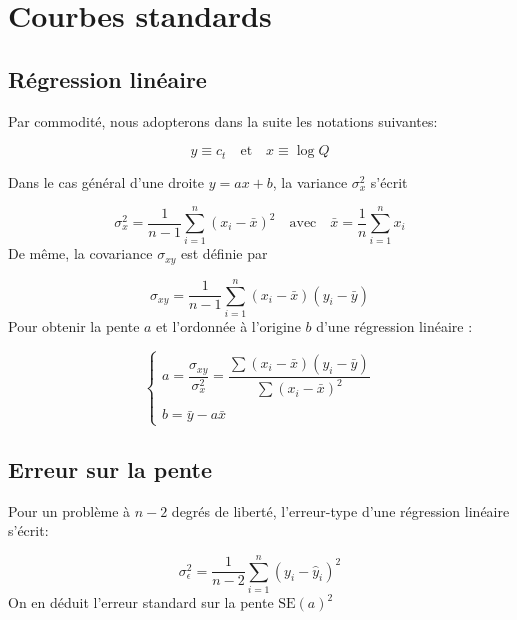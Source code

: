 \documentclass[a4paper,10pt]{article}
\begin{document}
\section{Courbes standards}

\subsection{Régression linéaire}

Par commodité, nous adopterons dans la suite les notations suivantes:

\begin{equation}
 y\equiv c_t \quad \text{et} \quad x\equiv\log Q
\end{equation}

Dans le cas général d'une droite $y=ax+b$, la variance $\sigma_x^2$ s'écrit

\begin{equation}
\sigma_x^2=\displaystyle\frac{1}{n-1}\sum_{i=1}^{n}(x_i-\bar{x})^2
\quad\text{avec}\quad \bar{x}=\frac{1}{n}\sum_{i=1}^{n}x_i
\end{equation}
De même, la covariance $\sigma_{xy}$ est définie par

\begin{equation}
 \sigma_{xy} =
\displaystyle\frac{1}{n-1}\sum_{i=1}^{n}(x_i-\bar{x})(y_i-\bar{y})
\end{equation}
Pour obtenir la pente $a$ et l'ordonnée à l'origine $b$ d'une régression linéaire :

\begin{equation}
 \left\lbrace 
\begin{array}{l}
 a = \dfrac{\sigma_{xy}}{\sigma_x^2}=\dfrac{\sum(x_i-\bar{x})(y_i-\bar{y})}{\sum(x_i-\bar{x})^2} \\ \\
 b = \bar{y}-a\bar{x}
\end{array}
\right.
\end{equation}


\subsection{Erreur sur la pente}

Pour un problème à $n-2$ degrés de liberté, l'erreur-type d'une régression
linéaire s'écrit:

\begin{equation}
 \sigma_{\epsilon}^2 = \displaystyle\frac{1}{n-2}\sum_{i=1}^{n}(y_i-\hat{y}_i)^2
\end{equation}
On en déduit l'erreur standard sur la pente $\text{SE}(a)^2$
\end{document}
